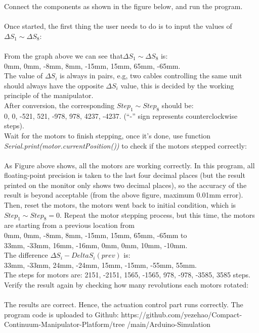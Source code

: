 Connect the components as shown in the figure below, and run the program. \\
\\
Once started, the first thing the user needs to do is to input the values of $\Delta S_1 \sim \Delta S_8$: \\
\\
From the graph above we can see that$\Delta S_1 \sim \Delta S_8$ is:\\ 0mm, 0mm, -8mm, 8mm, -15mm, 15mm, 65mm, 
-65mm.\\ The value of $\Delta S_i$ is always in pairs, e.g, two cables controlling the same unit should always have 
the opposite $\Delta S_i$ value, this is decided by the working principle of the manipulator. \\
After conversion, the corresponding $Step_1 \sim Step_8$ should be: \\0, 0, -521, 521, -978, 978, 4237, -4237. 
(“-” sign represents counterclockwise steps). \\
Wait for the motors to finish stepping, once it's done, use function \emph{Serial.print(motor.currentPosition())} to 
check if the motors stepped correctly: \\
\\
As Figure above shows, all the motors are working correctly. In this program, all floating-point precision 
is taken to the last four decimal places (but the result printed on the monitor only shows two decimal places), 
so the accuracy of the result is beyond acceptable (from the above figure, maximum 0.01mm error).\\
Then, reset the motors, the motors went back to initial condition, which is $Step_1 \sim Step_8=0$. Repeat the 
motor stepping process, but this time, the motors are starting from a previous location from\\0mm, 0mm, -8mm, 
8mm, -15mm, 15mm, 65mm, -65mm to\\33mm, -33mm, 16mm, -16mm, 0mm, 0mm, 10mm, -10mm.\\
The difference $\Delta S_i - Delta S_i(prev)$ is: \\
33mm, -33mm, 24mm, -24mm, 15mm, -15mm, -55mm, 55mm.\\
The steps for motors are: 2151, -2151, 1565, -1565, 978, -978, -3585, 3585 steps.\\
Verify the result again by checking how many revolutions each motors rotated:\\
\\
The results are correct. Hence, the actuation control part runs correctly.
The program code is uploaded to Github: https://github.com/yezehao/Compact-Continuum-Manipulator-Platform/tree
/main/Arduino-Simulation


